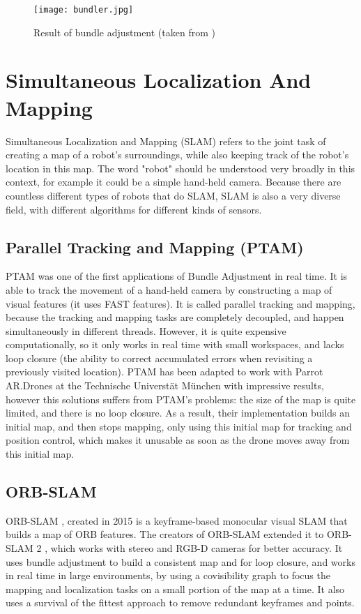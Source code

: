 \begin{figure}[H]
\centering
\texttt{[image: bundler.jpg]}
\caption{Result of bundle adjustment (taken from \cite{bundler})}
\label{fig:bundler}
\end{figure}

\section{Simultaneous Localization And Mapping}
Simultaneous Localization and Mapping (SLAM) refers to the joint task of creating a map of a robot's surroundings, while also keeping track of the robot's location in this map. The word "robot" should be understood very broadly in this context, for example it could be a simple hand-held camera. Because there are countless different types of robots that do SLAM, SLAM is also a very diverse field, with different algorithms for different kinds of sensors.

\subsection{Parallel Tracking and Mapping (PTAM)}
PTAM \cite{ptam} was one of the first applications of Bundle Adjustment in real time. It is able to track the movement of a hand-held camera by constructing a map of visual features (it uses FAST features). It is called parallel tracking and mapping, because the tracking and mapping tasks are completely decoupled, and happen simultaneously in different threads. However, it is quite expensive computationally, so it only works in real time with small workspaces, and lacks loop closure (the ability to correct accumulated errors when revisiting a previously visited location). PTAM has been adapted to work with Parrot AR.Drones at the Technische Universtät München \cite{engel2011msc} with impressive results, however this solutions suffers from PTAM's problems: the size of the map is quite limited, and there is no loop closure. As a result, their implementation builds an initial map, and then stops mapping, only using this initial map for tracking and position control, which makes it unusable as soon as the drone moves away from this initial map.
\newpage
\subsection{ORB-SLAM}
ORB-SLAM \cite{orbslam}, created in 2015 is a keyframe-based monocular visual SLAM that builds a map of ORB features. The creators of ORB-SLAM extended it to ORB-SLAM 2 \cite{orbslam2}, which works with stereo and RGB-D cameras for better accuracy. It uses bundle adjustment to build a consistent map and for loop closure, and works in real time in large environments, by using a covisibility graph to focus the mapping and localization tasks on a small portion of the map at a time. It also uses a survival of the fittest approach to remove redundant keyframes and points.

